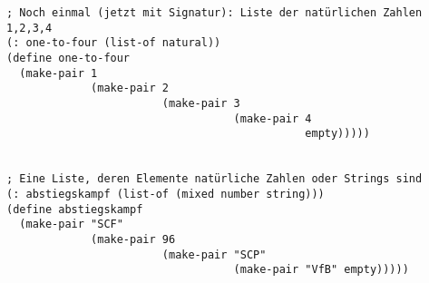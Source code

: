 \begin{lstlisting}[frame=single]
; Noch einmal (jetzt mit Signatur): Liste der natürlichen Zahlen 1,2,3,4
(: one-to-four (list-of natural))
(define one-to-four
  (make-pair 1
             (make-pair 2
                        (make-pair 3
                                   (make-pair 4
                                              empty)))))


; Eine Liste, deren Elemente natürliche Zahlen oder Strings sind
(: abstiegskampf (list-of (mixed number string)))
(define abstiegskampf
  (make-pair "SCF"
             (make-pair 96
                        (make-pair "SCP"
                                   (make-pair "VfB" empty)))))

\end{lstlisting}